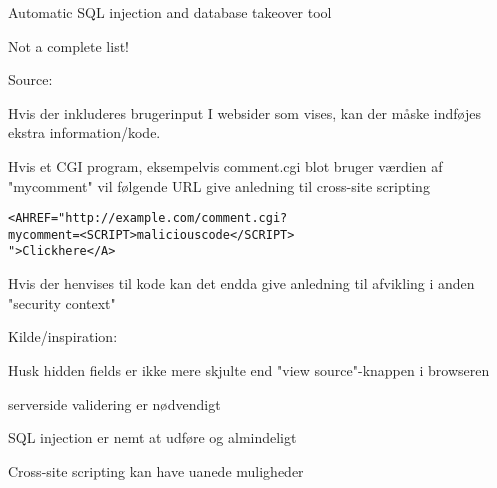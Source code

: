 \documentclass[20pt,landscape,a4paper,footrule]{foils}
\begin{document}
\begin{list1}
\item Automatic SQL injection and database takeover tool
\end{list1}




Not a complete list!

Source: 


\begin{list1}
\item Hvis der inkluderes brugerinput I websider som vises, kan
der måske indføjes ekstra information/kode.
\item Hvis et CGI program, eksempelvis comment.cgi blot bruger værdien af "mycomment" vil
følgende URL give anledning til cross-site scripting
\begin{alltt}
<A HREF="http://example.com/comment.cgi?
mycomment=<SCRIPT>malicious code</SCRIPT>
">Click here</A>
\end{alltt}
\item Hvis der henvises til kode kan det endda give anledning til
afvikling i anden "security context"
\item Kilde/inspiration:
\end{list1}




\begin{list1}
\item Husk hidden fields er ikke mere skjulte end
"view source"-knappen i browseren
\item serverside validering er nødvendigt
\item SQL injection er nemt at udføre og almindeligt
\item Cross-site scripting kan have uanede muligheder
\end{list1}




\end{document}
